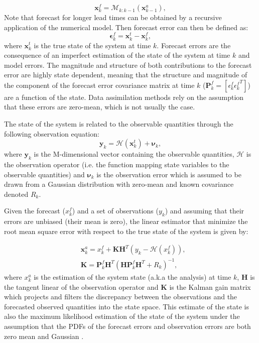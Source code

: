 \documentclass[num-refs]{wiley-article}
\renewcommand{\v}[1]{\ensuremath{\mathbf{#1}}}
\newcommand{\gv}[1]{\bm{#1}}
\begin{document}
\begin{equation}
\label{EQU:detfor}
\v x^{f}_{k} =  %
\mathcal{M}_{k:k-1}(\v x^{a}_{k-1}),
\end{equation}
Note that forecast for longer lead times can be obtained by a recursive application of the numerical model. 
Then forecast error can then be defined as:  
\begin{equation}
\label{EQU:forerr}
\gv \epsilon_{k}^{f} = \v x^{t}_{k} - \v x^{f}_{k},
\end{equation}
where $\v x^{t}_{k}$ is the true state of the system at time $k$. Forecast errors are the consequence of an imperfect estimation of the state of the system at time $k$ and model errors. The magnitude and structure of both contributions to the forecast error are highly state dependent, meaning that the structure and magnitude of the component of the forecast error covariance matrix at time $k$ ($\gv P^{f}_{k} = [\epsilon_{k}^{f} {\epsilon_{k}^{f}}^T]$) are a function of the state. Data assimilation methods rely on the assumption that these errors are zero-mean, which is not usually the case. 

The state of the system is related to the observable quantities through the following observation equation:
\begin{equation}
\label{EQU:obsmodel}
\gv y_{k} = \mathcal{H}( \v x^{t}_{k} ) + \gv \nu_{k},
\end{equation}
where $\gv y_{k}$ is the M-dimensional vector containing the observable quantities, $\mathcal{H}$ is the observation operator (i.e. the function mapping state variables to the observable quantities) and $\gv \nu_k$ is the observation error which is assumed to be drawn from a Gaussian distribution with zero-mean and known covariance denoted $R_k$.

Given the forecast ($x^{f}_{k}$) and a set of observations ($y_{k}$) and assuming that their errors are unbiased (their mean is zero), the linear estimator that minimize the root mean square error with respect to the true state of the system is given by:

\begin{equation}
\label{EQU:analysis}
\begin{split}
&\gv x^a_{k} = x^f_{k} + \gv{K}\gv{H}^T(y_k - \mathcal{H}(x^f_{k}) ), \\
&\gv{K} = \gv{P}^f_k \gv{H}^T(\gv{H} \gv{P}^f_k \gv{H}^T + R_k)^{-1}, 
\end{split}
\end{equation}
where $x^a_{k}$ is the estimation of the system state (a.k.a the analysis) at time $k$, $\gv{H}$ is the tangent linear of the observation operator and $\gv K$ is the Kalman gain matrix which projects and filters the discrepancy between the observations and the forecasted observed quantities into the state space. This estimate of the state is also the maximum likelihood estimation of the state of the system under the assumption that the PDFs of the forecast errors and observation errors are both zero mean and Gaussian \citep{carrassi2018}. 
\end{document}
